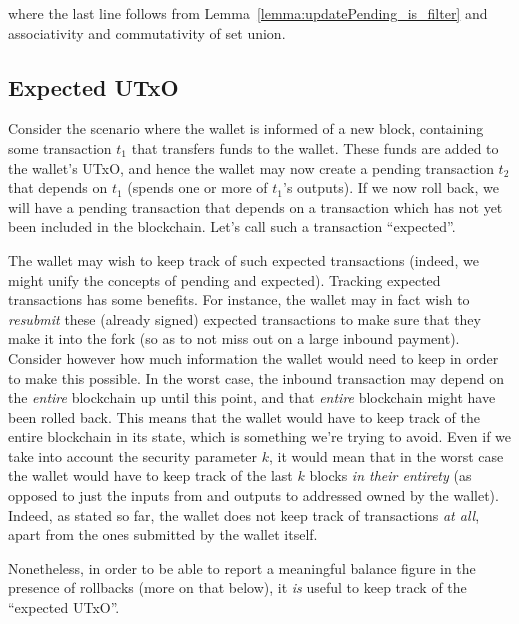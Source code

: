 \documentclass{article}
\begin{document}
where the last line follows from Lemma~\ref{lemma:updatePending_is_filter} and
associativity and commutativity of set union.

\subsection{Expected UTxO}
\label{sec:expected_UTxO}

Consider the scenario where the wallet is informed of a new block, containing
some transaction $t_1$ that transfers funds to the wallet. These funds are
added to the wallet's UTxO, and hence the wallet may now create a pending
transaction $t_2$ that depends on $t_1$ (spends one or more of $t_1$'s outputs).
If we now roll back, we will have a pending transaction that depends on a
transaction which has not yet been included in the blockchain. Let's call
such a transaction ``expected''.

The wallet may wish to keep track of such expected transactions (indeed, we
might unify the concepts of pending and expected). Tracking expected
transactions has some benefits. For instance, the wallet may in fact wish to
\emph{resubmit} these (already signed) expected transactions to make sure that
they make it into the fork (so as to not miss out on a large inbound payment).
Consider however how much information the wallet would need to keep in order
to make this possible. In the worst case, the inbound transaction may depend
on the \emph{entire} blockchain up until this point, and that \emph{entire}
blockchain might have been rolled back. This means that the wallet would have
to keep track of the entire blockchain in its state, which is something we're
trying to avoid. Even if we take into account the security parameter $k$, it
would mean that in the worst case the wallet would have to keep track of the
last $k$ blocks \emph{in their entirety} (as opposed to just the inputs from
and outputs to addressed owned by the wallet). Indeed, as stated so far,
the wallet does not keep track of transactions \emph{at all}, apart from the
ones submitted by the wallet itself.

Nonetheless, in order to be able to report a meaningful balance figure in
the presence of rollbacks (more on that below), it \emph{is} useful to keep
track of the ``expected UTxO''.
\end{document}
